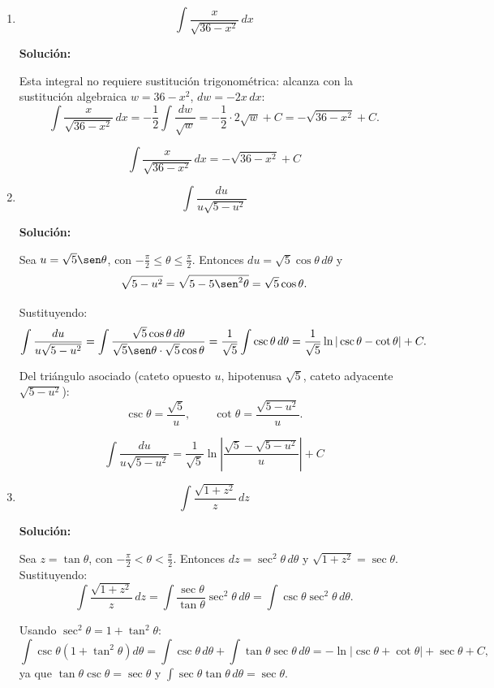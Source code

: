 \documentclass[12pt]{article}
\newcommand{\solucion}{%
    \vspace{0.8em}%
    \textbf{Solución:}%
}
\begin{document}
\begin{enumerate}[label=\alph*.-]

    \item
    \[
    \int\frac{x}{\sqrt{36-x^2}}\,dx
    \]

    \solucion

    Esta integral no requiere sustitución trigonométrica: alcanza con la
    sustitución algebraica $w=36-x^2$, $dw=-2x\,dx$:
    \[
    \int\frac{x}{\sqrt{36-x^2}}\,dx=-\frac12\int\frac{dw}{\sqrt w}
    =-\frac12\cdot2\sqrt w+C=-\sqrt{36-x^2}+C.
    \]

    \[
    \boxed{
    \int\frac{x}{\sqrt{36-x^2}}\,dx=-\sqrt{36-x^2}+C
    }
    \]


    \item
    \[
    \int\frac{du}{u\sqrt{5-u^2}}
    \]

    \solucion

    Sea $u=\sqrt5\sen\theta$, con $-\frac\pi2\le\theta\le\frac\pi2$.
    Entonces $du=\sqrt5\cos\theta\,d\theta$ y
    \[
    \sqrt{5-u^2}=\sqrt{5-5\sen^2\theta}=\sqrt5\cos\theta.
    \]

    Sustituyendo:
    \[
    \int\frac{du}{u\sqrt{5-u^2}}
    =\int\frac{\sqrt5\cos\theta\,d\theta}{\sqrt5\sen\theta\cdot\sqrt5\cos\theta}
    =\frac{1}{\sqrt5}\int\csc\theta\,d\theta
    =\frac{1}{\sqrt5}\ln|\csc\theta-\cot\theta|+C.
    \]

    Del triángulo asociado (cateto opuesto $u$, hipotenusa $\sqrt5$,
    cateto adyacente $\sqrt{5-u^2}$):
    \[
    \csc\theta=\frac{\sqrt5}{u},\qquad\cot\theta=\frac{\sqrt{5-u^2}}{u}.
    \]

    \[
    \boxed{
    \int\frac{du}{u\sqrt{5-u^2}}
    =\frac{1}{\sqrt5}\ln\left|\frac{\sqrt5-\sqrt{5-u^2}}{u}\right|+C
    }
    \]


    \item
    \[
    \int\frac{\sqrt{1+z^2}}{z}\,dz
    \]

    \solucion

    Sea $z=\tan\theta$, con $-\frac\pi2<\theta<\frac\pi2$. Entonces
    $dz=\sec^2\theta\,d\theta$ y $\sqrt{1+z^2}=\sec\theta$. Sustituyendo:
    \[
    \int\frac{\sqrt{1+z^2}}{z}\,dz
    =\int\frac{\sec\theta}{\tan\theta}\sec^2\theta\,d\theta
    =\int\csc\theta\sec^2\theta\,d\theta.
    \]

    Usando $\sec^2\theta=1+\tan^2\theta$:
    \[
    \int\csc\theta\left(1+\tan^2\theta\right)d\theta
    =\int\csc\theta\,d\theta+\int\tan\theta\sec\theta\,d\theta
    =-\ln|\csc\theta+\cot\theta|+\sec\theta+C,
    \]
    ya que $\tan\theta\csc\theta=\sec\theta$ y
    $\displaystyle\int\sec\theta\tan\theta\,d\theta=\sec\theta$.


\end{enumerate}
\end{document}
